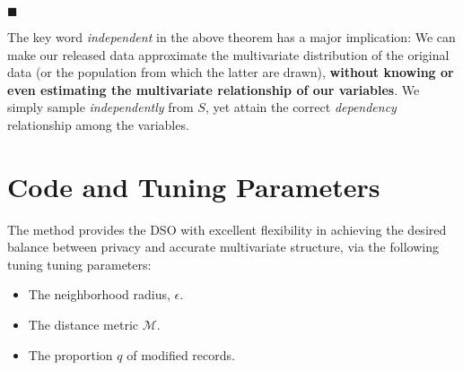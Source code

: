 \documentclass[11pt]{article}
\begin{document}
$\blacksquare$

\bigskip

The key word {\it independent} in the above theorem has a major
implication:  We can make our released data approximate the multivariate
distribution of the original data (or the population from which the
latter are drawn), {\bf without knowing or even estimating the
multivariate relationship of our variables}.  We simply sample {\it
independently} from $S$, yet attain the correct {\it dependency}
relationship among the variables.





\section{Code and Tuning Parameters}

The method provides the DSO with excellent flexibility in achieving the
desired balance between privacy and accurate multivariate structure, via
the following tuning tuning parameters:

\begin{itemize}

\item The neighborhood radius, $\epsilon$.

\item The distance metric $\mathcal{M}$.

\item The proportion $q$ of modified records.  

\end{itemize}
\end{document}
